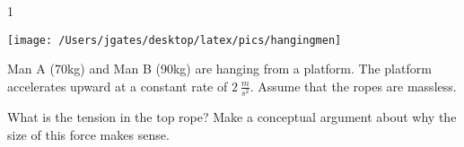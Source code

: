 
\AddToShipoutPicture*{\BackgroundPic}

\addtocounter {ProbNum} {1}

\begin{floatingfigure}[r]{.33\textwidth}
\texttt{[image: /Users/jgates/desktop/latex/pics/hangingmen]}
\end{floatingfigure}
 
{\bf \Large{}}Man A (70kg) and Man B (90kg) are hanging from a platform.  The platform accelerates upward at a constant rate of ${2~\tfrac{m}{s^2}}$. Assume that the ropes are massless. 

\bigskip
What is the tension in the top rope? Make a conceptual argument about why the size of this force makes sense.



\vfill
\newpage
